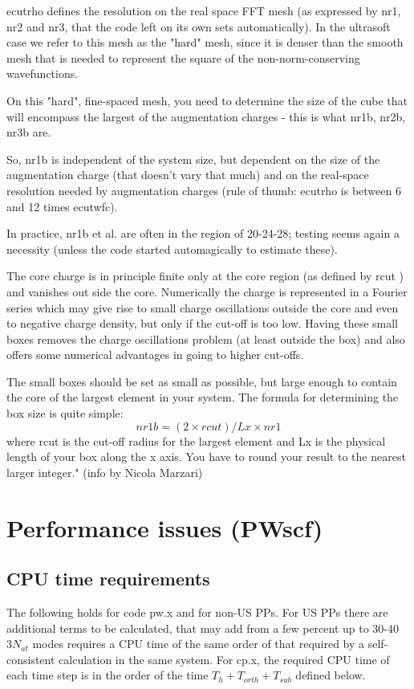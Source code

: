\documentclass[12pt,a4paper]{article}
\begin{document}
ecutrho defines the resolution on the real space FFT mesh (as expressed 
by nr1, nr2 and nr3, that the code left on its own sets automatically).
In the ultrasoft case we refer to this mesh as the "hard" mesh, since it 
is denser than the smooth mesh that is needed to represent the square 
of the non-norm-conserving wavefunctions.
  
On this "hard", fine-spaced mesh, you need to determine the size of the
cube that will encompass the largest of the augmentation charges - this
is what nr1b, nr2b, nr3b are.
  
So, nr1b is independent of the system size, but dependent on the size
of the augmentation charge (that doesn't vary that much) and on the
real-space resolution needed by augmentation charges (rule of thumb:
ecutrho is between 6 and 12 times ecutwfc).

In practice, nr1b et al. are often in the region of 20-24-28; testing seems
again a necessity (unless the code started automagically to estimate these).

The core charge is in principle finite only at the core region (as defined
by rcut ) and vanishes out side the core. Numerically the charge is
represented in a Fourier series which may give rise to small charge
oscillations outside the core and even to negative charge density, but
only if the cut-off is too low. Having these small boxes removes the
charge oscillations problem (at least outside the box) and also offers
some numerical advantages in going to higher cut-offs.

The small boxes should be set as small as possible, but large enough
to contain the core of the largest element in your system.
The formula for determining the box size is quite simple: 
$$
   nr1b = (2 \times rcut )/Lx \times nr1
$$
where rcut is the cut-off radius for the largest element and Lx is the
physical length of your box along the x axis. You have to round your
result to the nearest larger integer." (info by Nicola Marzari)

\section{Performance issues (PWscf)}

\subsection{CPU time requirements}

The following holds for code pw.x and for non-US PPs. For US PPs there
are additional terms to be calculated, that may add from a few percent 
up to 30-40%
$3N_{at}$ modes requires a CPU time of the same order of that required by a
self-consistent calculation in the same system. For cp.x, the required CPU 
time of each time step is in the order of the time $T_h + T_{orth} + T_{sub}$ 
defined below.
\end{document}
